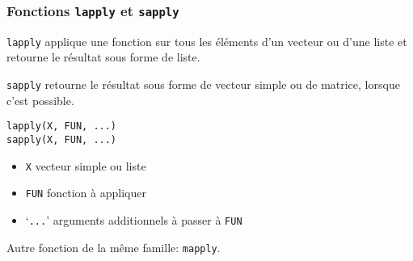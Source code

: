 \begin{frame}[fragile]
  \frametitle{Fonctions \texttt{lapply} et \texttt{sapply}}

  \texttt{lapply} applique une fonction sur tous les éléments d'un
  \alert{vecteur} ou d'une \alert{liste} et retourne le résultat sous
  forme de liste.

  \texttt{sapply} retourne le résultat sous forme de vecteur simple ou
  de matrice, lorsque c'est possible.
  \begin{Schunk}
\begin{lstlisting}
lapply(X, FUN, ...)
sapply(X, FUN, ...)
\end{lstlisting}
  \end{Schunk}
  \begin{itemize}
  \item \texttt{X} vecteur simple ou liste
  \item \texttt{FUN} fonction à appliquer
  \item `\texttt{...}' arguments additionnels à passer à \texttt{FUN}
  \end{itemize}

  Autre fonction de la même famille: \texttt{mapply}.

  \pause
\end{frame}

